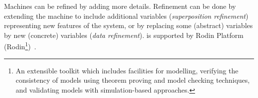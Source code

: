 Machines can be refined by adding more details.  Refinement can be done by extending the machine 
to include additional variables (\emph{superposition refinement}) representing new features of 
the system, or by replacing some (abstract) variables by new (concrete) variables (\emph{data refinement}).  
\EventB is supported by  Rodin Platform (Rodin\footnote{An extensible toolkit which includes 
facilities for modelling, verifying the consistency of models using theorem proving and model 
checking techniques, and validating models with simulation-based approaches.})~\cite{abrial10:_rodin}.

